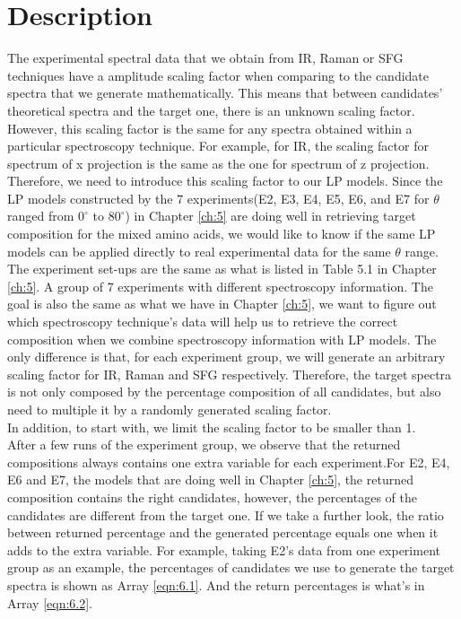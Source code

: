  \label{ch:6}
\section{Description}
The experimental spectral data that we obtain from IR, Raman or SFG techniques have a amplitude scaling factor when comparing to the candidate spectra that we generate mathematically. This means that between candidates' theoretical spectra and the target one, there is an unknown scaling factor. However, this scaling factor is the same for any spectra obtained within a particular spectroscopy technique. For example, for IR, the scaling factor for spectrum of x projection is the same as the one for spectrum of z projection. Therefore, we need to introduce this scaling factor to our LP models. Since the LP models constructed by the 7 experiments(E2, E3, E4, E5, E6, and E7 for $\theta$ ranged from $0^{\circ}$ to $80^{\circ}$) in Chapter \ref{ch:5} are doing well in retrieving target composition for the mixed amino acids, we would like to know if the same LP models can be applied directly to real experimental data for the same $\theta$ range.\\

The experiment set-ups are the same as what is listed in Table 5.1 in Chapter \ref{ch:5}. A group of 7 experiments with different spectroscopy information. The goal is also the same as what we have in Chapter \ref{ch:5}, we want to figure out which spectroscopy technique's data will help us to retrieve the correct composition when we combine spectroscopy information with LP models. The only difference is that, for each experiment group, we will generate an arbitrary scaling factor for IR, Raman and SFG respectively. Therefore, the target spectra is not only composed by the percentage composition of all candidates, but also need to multiple it by a randomly generated scaling factor. \\

In addition, to start with, we limit the scaling factor to be smaller than 1. \\

After a few runs of the experiment group, we observe that the returned compositions always contains one extra variable for each experiment.For E2, E4, E6 and E7, the models that are doing well in Chapter \ref{ch:5}, the returned composition contains the right candidates, however, the percentages of the candidates are different from the target one. If we take a further look, the ratio between returned percentage and the generated percentage equals one when it adds to the extra variable.
For example, taking E2's data from one experiment group as an example, the percentages of candidates we use to generate the target spectra is shown as Array \ref{eqn:6.1}. And the return percentages is what's in Array \ref{eqn:6.2}.\\


